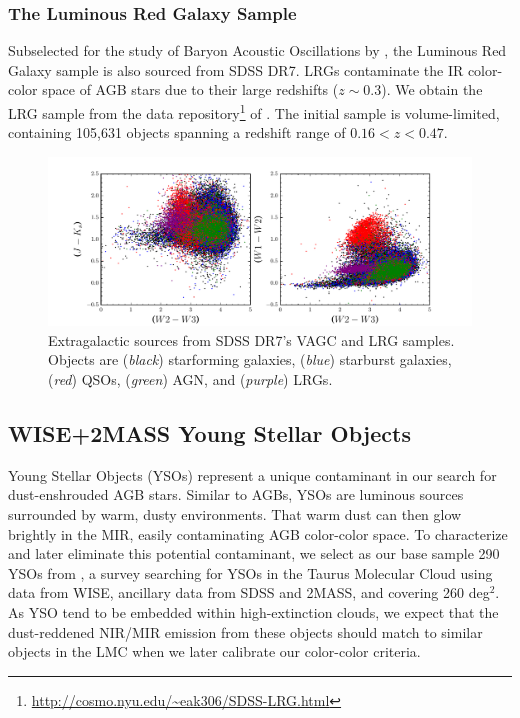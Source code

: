 \subsubsection{The Luminous Red Galaxy Sample}
Subselected for the study of Baryon Acoustic Oscillations by \cite{2010ApJ...710.1444K}, the Luminous Red Galaxy sample \citep[LRGs;][]{2001AJ....122.2267E} is also sourced from SDSS DR7. LRGs contaminate the IR color-color space of AGB stars due to their large redshifts ($z\sim0.3$). We obtain the  LRG sample from the data repository\footnote{\url{http://cosmo.nyu.edu/~eak306/SDSS-LRG.html}} of \cite{2010ApJ...710.1444K}. The initial sample is volume-limited, containing 105,631 objects spanning a redshift range of $0.16 < z < 0.47$.

\begin{figure}[h]
\includegraphics[width=6in]{figs/contaminant_color_color_distr.pdf}
\caption{Extragalactic sources from SDSS DR7's VAGC and LRG samples. Objects are (\emph{black}) starforming galaxies, (\emph{blue}) starburst galaxies, (\emph{red}) QSOs, (\emph{green}) AGN, and (\emph{purple}) LRGs. \label{fig:wisecontaminants}}
\end{figure}

\subsection{WISE+2MASS Young Stellar Objects}
Young Stellar Objects (YSOs) represent a unique contaminant in our search for dust-enshrouded AGB stars. Similar to AGBs, YSOs are luminous sources surrounded by warm, dusty environments. That warm dust can then glow brightly in the MIR, easily contaminating AGB color-color space. To characterize and later eliminate this potential contaminant, we select as our base sample 290 YSOs from \cite{2011ApJS..196....4R}, a survey searching for YSOs in the Taurus Molecular Cloud using data from WISE, ancillary data from SDSS and 2MASS, and covering 260 deg$^2$. As YSO tend to be embedded within high-extinction clouds, we expect that the dust-reddened NIR/MIR emission from these objects should match to similar objects in the LMC when we later calibrate our color-color criteria.

